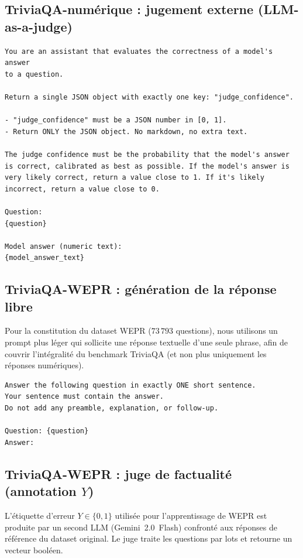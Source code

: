 \documentclass[12pt,a4paper]{article}
\begin{document}
\subsection{TriviaQA-numérique : jugement externe (LLM-as-a-judge)}

\begin{verbatim}
You are an assistant that evaluates the correctness of a model's answer
to a question.

Return a single JSON object with exactly one key: "judge_confidence".

- "judge_confidence" must be a JSON number in [0, 1].
- Return ONLY the JSON object. No markdown, no extra text.

The judge confidence must be the probability that the model's answer
is correct, calibrated as best as possible. If the model's answer is
very likely correct, return a value close to 1. If it's likely
incorrect, return a value close to 0.

Question:
{question}

Model answer (numeric text):
{model_answer_text}
\end{verbatim}

\subsection{TriviaQA-WEPR : génération de la réponse libre}

Pour la constitution du dataset WEPR ($73\,793$ questions), nous utilisons un prompt plus léger qui sollicite une réponse textuelle d'une seule phrase, afin de couvrir l'intégralité du benchmark TriviaQA (et non plus uniquement les réponses numériques).

\begin{verbatim}
Answer the following question in exactly ONE short sentence.
Your sentence must contain the answer.
Do not add any preamble, explanation, or follow-up.

Question: {question}
Answer:
\end{verbatim}

\subsection{TriviaQA-WEPR : juge de factualité (annotation $Y$)}

L'étiquette d'erreur $Y \in \{0, 1\}$ utilisée pour l'apprentissage de WEPR est produite par un second LLM (Gemini~2.0~Flash) confronté aux réponses de référence du dataset original. Le juge traite les questions par lots et retourne un vecteur booléen.
\end{document}
